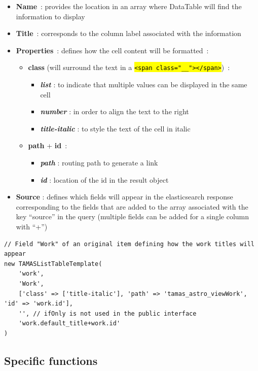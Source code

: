 \documentclass[a4paper,12pt,twoside]{book}
\let\OldTexttt\texttt
\renewcommand{\texttt}[1]{\OldTexttt{\hl{#1}}}
\begin{document}
\begin{itemize}
	\item \textbf{Name}~: provides the location in an array where DataTable will find the information to display
	\item \textbf{Title}~: corresponds to the column label associated with the information
	\item \textbf{Properties}~: defines how the cell content will be formatted~:
	\begin{itemize}
		\item \textbf{class} (will surround the text in a \texttt{\textless{}span class="\_\_"\textgreater{}\textless{}/span\textgreater{}})~:
		\begin{itemize}
			\item \textbf{\emph{list}} : to indicate that multiple values can be displayed in the same cell
			\item \textbf{\emph{number}} : in order to align the text to the right
			\item \textbf{\emph{title-italic}} : to style the text of the cell in italic
		\end{itemize}
		\item \textbf{path} + \textbf{id}~:
		\begin{itemize}
			\item \textbf{\emph{path}} : routing path to generate a link
			\item \textbf{\emph{id}} : location of the id in the result object
		\end{itemize}
	\end{itemize}
	\item \textbf{Source} : defines which fields will appear in the elasticsearch response corresponding to the fields that are added to the array associated with the key ``source'' in the query (multiple fields can be added for a single column with ``+'')
\end{itemize}

\begin{lstlisting}
// Field "Work" of an original item defining how the work titles will appear
new TAMASListTableTemplate(
    'work',
    'Work',
    ['class' => ['title-italic'], 'path' => 'tamas_astro_viewWork', 'id' => 'work.id'],
    '', // ifOnly is not used in the public interface
    'work.default_title+work.id'
)
\end{lstlisting}

			\subsection{Specific functions}\label{specific-functions}
\end{document}

